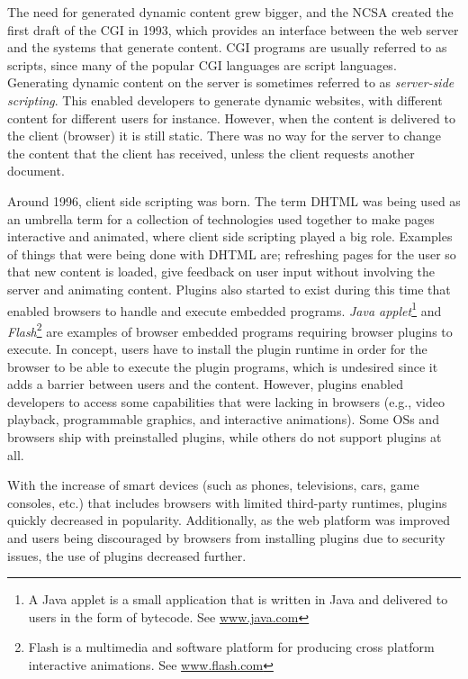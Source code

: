\documentclass[a4paper,11pt]{kth-mag}
\begin{document}
        The need for generated dynamic content grew bigger, and the \gls{NCSA} created the first draft of the \gls{CGI} in 1993, which provides an interface between the \gls{web} server and the systems that generate content.
        \gls{CGI} programs are usually referred to as scripts, since many of the popular \gls{CGI} languages are script languages.
        Generating dynamic content on the server is sometimes referred to as \emph{server-side scripting}.
        This enabled developers to generate dynamic websites, with different content for different users for instance.
        However, when the content is delivered to the client (\gls{browser}) it is still static.
        There was no way for the server to change the content that the client has received, unless the client requests another \gls{document}.

        Around 1996, client side scripting was born.
        The term \gls{DHTML} was being used as an umbrella term for a collection of technologies used together to make pages interactive and animated, where client side scripting played a big role.
        Examples of things that were being done with \gls{DHTML} are; refreshing pages for the user so that new content is loaded, give feedback on user input without involving the server and animating content.
        Plugins also started to exist during this time that enabled \glspl{browser} to handle and execute embedded programs.
        \emph{Java applet}\footnote{A Java applet is a small application that is written in Java and delivered to users in the form of bytecode. See \url{www.java.com}} and \emph{Flash}\footnote{Flash is a multimedia and software platform for producing cross platform interactive animations. See \url{www.flash.com}} are examples of \gls{browser} embedded programs requiring \gls{browser} plugins to execute.
        In concept, users have to install the plugin runtime in order for the \gls{browser} to be able to execute the plugin programs, which is undesired since it adds a barrier between users and the content.
        However, plugins enabled developers to access some capabilities that were lacking in \glspl{browser} (e.g., video playback, programmable graphics, and interactive animations).
        Some \glspl{OS} and \glspl{browser} ship with preinstalled plugins, while others do not support plugins at all.

        With the increase of smart devices (such as phones, televisions, cars, game consoles, etc.) that includes \glspl{browser} with limited \gls{third-party} runtimes, plugins quickly decreased in popularity.
        Additionally, as the \gls{web} platform was improved and users being discouraged by \glspl{browser} from installing plugins due to security issues, the use of plugins decreased further.
\end{document}
